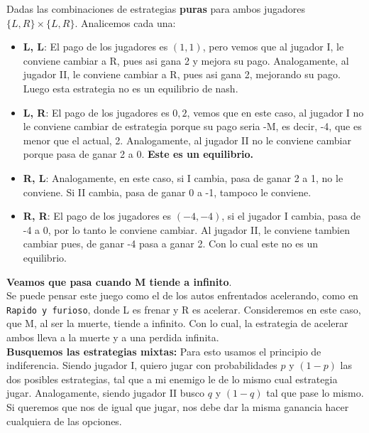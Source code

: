 \vspace{0.5cm}
Dadas las combinaciones de estrategias \textbf{puras} para ambos jugadores $\{L, R\} \times \{L, R\}$. Analicemos cada una:
\begin{itemize}
	\item \textbf{L, L}: El pago de los jugadores es $(1,1)$, pero vemos que al jugador I, le conviene cambiar a R, pues asi gana 2 y mejora su pago. Analogamente, al jugador II, le conviene cambiar a R, pues asi gana 2, mejorando su pago. Luego esta estrategia no es un equilibrio de nash.   
	\item \textbf{L, R}: El pago de los jugadores es $0, 2$, vemos que en este caso, al jugador I no le conviene cambiar de estrategia porque su pago seria -M, es decir, -4, que es menor que el actual, 2. Analogamente, al jugador II no le conviene cambiar porque pasa de ganar 2 a 0. \textbf{Este es un equilibrio.}
	\item \textbf{R, L}: Analogamente, en este caso, si I cambia, pasa de ganar 2 a 1, no le conviene. Si II cambia, pasa de ganar 0 a -1, tampoco le conviene.
	\item \textbf{R, R}: El pago de los jugadores es $(-4, -4)$, si el jugador I cambia, pasa de -4 a 0, por lo tanto le conviene cambiar. Al jugador II, le conviene tambien cambiar pues, de ganar -4 pasa a ganar 2. Con lo cual este no es un equilibrio.
\end{itemize}

\textbf{Veamos que pasa cuando M tiende a infinito}.\\

Se puede pensar este juego como el de los autos enfrentados acelerando, como en \texttt{Rapido y furioso}, donde L es frenar y R es acelerar. Consideremos en este caso, que M, al ser la muerte, tiende a infinito. Con lo cual, la estrategia de acelerar ambos lleva a la muerte y a una perdida infinita.\\

\textbf{Busquemos las estrategias mixtas:} Para esto usamos el principio de indiferencia. Siendo jugador I, quiero jugar con probabilidades $p$ y $(1-p)$ las dos posibles estrategias, tal que a mi enemigo le de lo mismo cual estrategia jugar. Analogamente, siendo jugador II busco $q$ y $(1-q)$ tal que pase lo mismo.\\
Si queremos que nos de igual que jugar, nos debe dar la misma ganancia hacer cualquiera de las opciones.\\

